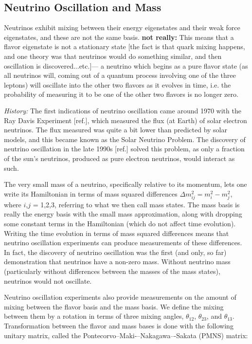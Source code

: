 \subsection{Neutrino Oscillation and Mass}

{\color{red}Neutrinos exhibit mixing between their energy eigenstates and their weak force eigenstates, and these are not the same basis. }  {\color{red}\textbf{not really:}  This means that a flavor eigenstate is not a stationary state} [the fact is that quark mixing happens, and one theory was that neutrinos would do something similar, and then oscillation is discovered...etc.]--- a neutrino which begins as a pure flavor state (as all neutrinos will, coming out of a quantum process involving one of the three leptons) will oscillate into the other two flavors as it evolves in time, i.e. the probability of measuring it to be one of the other two flavors is no longer zero.

{\color{gray}\emph{History:  }The first indications of neutrino oscillation came around 1970 with the Ray Davis Experiment [ref.], which measured the flux (at Earth) of solar electron neutrinos.  The flux measured was quite a bit lower than predicted by solar models, and this became known as the Solar Neutrino Problem.  The discovery of neutrino oscillation in the late 1990s [ref.] solved this problem, as only a fraction of the sun's neutrinos, produced as pure electron neutrinos, would interact as such.}

The very small mass of a neutrino, specifically relative to its momentum, lets one write its Hamiltonian in terms of mass squared differences $\Delta m_{ij}^{2} = m_{i}^{2} - m_{j}^{2}$, where $i$,$j$ = 1,2,3, referring to what we then call mass states.  The mass basis is really the energy basis with the small mass approximation, along with dropping some constant terms in the Hamiltonian (which do not affect time evolution).  Writing the time evolution in terms of mass squared differences means that neutrino oscillation experiments can produce measurements of these differences.  In fact, the discovery of neutrino oscillation was the first (and only, so far) demonstration that neutrinos have a non-zero mass.  Without neutrino mass (particularly without differences between the masses of the mass states), neutrinos would not oscillate.

Neutrino oscillation experiments also provide measurements on the amount of mixing between the flavor basis and the mass basis.  We define the mixing between them by a rotation in terms of three mixing angles, $\theta_{12}$, $\theta_{23}$, and $\theta_{13}$.  Transformation between the flavor and mass bases is done with the following unitary matrix, called the Pontecorvo--Maki-–Nakagawa–-Sakata (PMNS) matrix:

